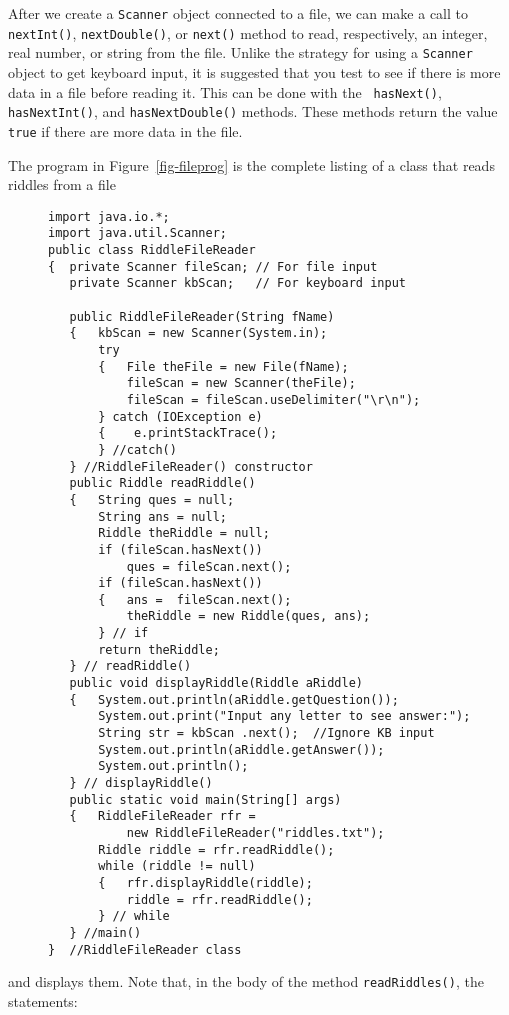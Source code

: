 After we create a {\tt Scanner} object connected to a file, we can
make a call to {\tt nextInt()}, {\tt nextDouble()}, or {\tt next()}
method to read, respectively, an integer, real number, or string from
the file.  Unlike the strategy for using a {\tt Scanner} object to get
keyboard input, it is suggested that you test to see if there is more
data in a file before reading it.  This can be done with the {\tt
hasNext()}, {\tt hasNextInt()}, and {\tt hasNextDouble()} methods.
These methods return the value {\tt true} if there are more data in the
file.

The program in Figure~\ref{fig-fileprog}
is the complete listing of a class that reads riddles from a file
\begin{figure}[h!]
\jjjprogstart
\begin{jjjlisting}[26.5pc]
\begin{lstlisting}
import java.io.*;
import java.util.Scanner;
public class RiddleFileReader
{  private Scanner fileScan; // For file input
   private Scanner kbScan;   // For keyboard input

   public RiddleFileReader(String fName)
   {   kbScan = new Scanner(System.in);
       try
       {   File theFile = new File(fName);
           fileScan = new Scanner(theFile);
           fileScan = fileScan.useDelimiter("\r\n");
       } catch (IOException e)
       {    e.printStackTrace();
       } //catch()
   } //RiddleFileReader() constructor
   public Riddle readRiddle()
   {   String ques = null;
       String ans = null;
       Riddle theRiddle = null;
       if (fileScan.hasNext())
           ques = fileScan.next();
       if (fileScan.hasNext())
       {   ans =  fileScan.next();
           theRiddle = new Riddle(ques, ans);
       } // if
       return theRiddle;
   } // readRiddle()
   public void displayRiddle(Riddle aRiddle)
   {   System.out.println(aRiddle.getQuestion());
       System.out.print("Input any letter to see answer:");
       String str = kbScan .next();  //Ignore KB input
       System.out.println(aRiddle.getAnswer());
       System.out.println();
   } // displayRiddle()
   public static void main(String[] args)
   {   RiddleFileReader rfr =
           new RiddleFileReader("riddles.txt");
       Riddle riddle = rfr.readRiddle();
       while (riddle != null)
       {   rfr.displayRiddle(riddle);
           riddle = rfr.readRiddle();
       } // while
   } //main()
}  //RiddleFileReader class
\end{lstlisting}
\end{jjjlisting}
\end{figure}
and displays them.  Note that, in the body of the method {\tt readRiddles()},
the statements:

